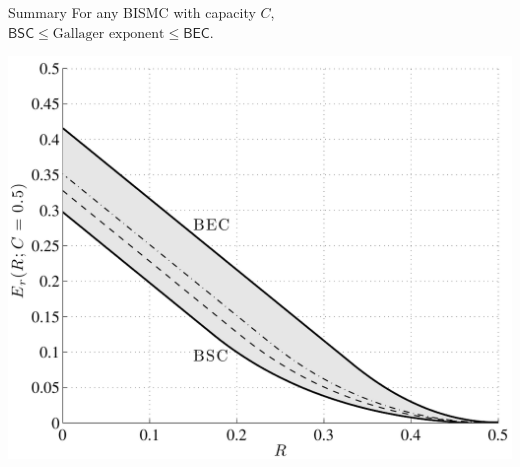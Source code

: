 \documentclass[mathserif]{beamer}
\newcommand{\BSC}{{\mathsf{BSC}}}
\newcommand{\BEC}{{\mathsf{BEC}}}
\begin{document}
\surprise

\begin{frame}
  \centering
  \vspace{-2ex}
  \begin{turn}{8}
  \hspace{-6ex}
  \begin{minipage}{0.8\textwidth}
  \begin{block}{Summary}  
    \vspace{1ex}  
    For any BISMC with capacity $C$, \\[1ex]
    $\BSC \le \text{Gallager exponent}   \le \BEC$.
  \end{block}
  \end{minipage}
  \end{turn}

  \vspace{2ex}
  \hspace{18ex}
  \begin{turn}{-2}
  \includegraphics[scale=0.35]{examplefig.pdf}
  \end{turn}
\end{frame} 

\applause
\end{document}
